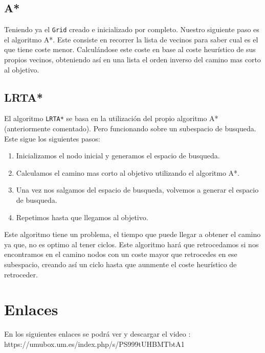  \subsection{A*}
 Teniendo ya el \texttt{Grid} creado e inicializado por completo. Nuestro siguiente paso es el algoritmo A*. Este consiste en recorrer la lista de vecinos para saber cual es el que tiene coste menor. Calculándose este coste en base al coste heurístico de sus propios vecinos, obteniendo así en una lista el orden inverso del camino mas corto al objetivo.
 
 \subsection{LRTA*}
 El algoritmo \texttt{LRTA*} se basa en la utilización del propio algoritmo A* (anteriormente comentado). Pero funcionando sobre un subespacio de busqueda. Este sigue los siguientes pasos:
 \begin{enumerate}
     \item Inicializamos el nodo inicial y generamos el espacio de busqueda. 
     \item Calculamos el camino mas corto al objetivo utilizando el algoritmo A*.
     \item Una vez nos salgamos del espacio de busqueda, volvemos a generar el espacio de busqueda.
     \item Repetimos hasta que llegamos al objetivo.
 \end{enumerate} 

Este algoritmo tiene un problema, el tiempo que puede llegar a obtener el camino ya que, no es optimo al tener ciclos. Este algoritmo hará que retrocedamos si nos encontramos en el camino nodos con un coste mayor que retrocedes en ese subespacio, creando así un ciclo hasta que aunmente el coste heurístico de retroceder.

\section{Enlaces}
En los siguientes enlaces se podrá ver y descargar el video : \\
https://umubox.um.es/index.php/s/PS999tUHBMTbtA1
 